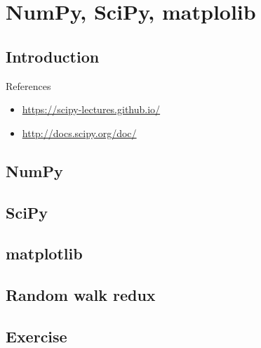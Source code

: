 \chapter{NumPy, SciPy, matplolib}

\section{Introduction}

References
\begin{itemize}
\item \url{https://scipy-lectures.github.io/}
\item \url{http://docs.scipy.org/doc/}
\end{itemize}

\section{NumPy}
\section{SciPy}
\section{matplotlib}
\section{Random walk redux}



\section{Exercise}

